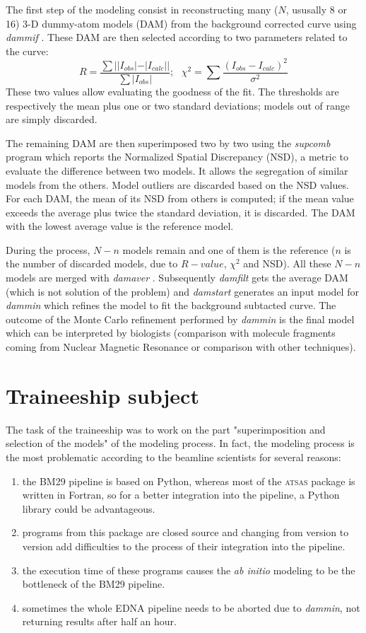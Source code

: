 \documentclass[a4paper, 11pt]{report}
\begin{document}
The first step of the modeling consist in reconstructing many ($N$, ususally 8
or 16) 3-D dummy-atom models (DAM) from the background corrected curve using 
\textit{dammif} \cite{dammif}. 
These DAM are then selected according to two parameters related to the 
curve: 
\[
R = \frac {\sum {||I_{obs}| - |I_{calc}||}}{\sum {|I_{obs}|}}; \ \ \ 
\chi^{2} = \sum {\frac {(I_{obs} - I_{calc})^{2}}{\sigma^{2}}}
\]
These two values allow evaluating the goodness of the fit. 
The thresholds are respectively the mean plus one or two standard 
deviations; models out of range are simply discarded.

The remaining DAM are then superimposed two by two using the 
\textit{supcomb} \cite{supcomb} program which reports the Normalized 
Spatial Discrepancy (NSD), a metric to evaluate the difference between 
two models. 
It allows the segregation of similar models from the others. 
Model outliers are discarded based on the NSD
values.
For each DAM, the mean of its NSD from others is computed; if the mean 
value exceeds the average plus twice the standard deviation, it is 
discarded. 
The DAM with the lowest average value is the reference model.

During the process, $N - n$ models remain and one of them is the 
reference ($n$ is the number of discarded models, due to $R-value$, 
$\chi^{2}$ and NSD). 
All these $N - n$ models are merged with \textit{damaver} 
\cite{damaver}. 
Subsequently \textit{damfilt} gets the average DAM (which is not solution of
the problem) and \textit{damstart} generates an input model for 
\textit{dammin} \cite{dammin} which refines the model to fit the 
background subtacted curve. 
The outcome of the Monte Carlo refinement performed by \textit{dammin} 
is the final model which can be interpreted by biologists (comparison 
with molecule fragments coming from Nuclear Magnetic Resonance or 
comparison with other techniques).

\section{Traineeship subject}

The task of the traineeship was to work on the part "superimposition 
and selection of the models" of the modeling process. 
In fact, the modeling process is the most problematic according to 
the beamline scientists for several reasons:
\begin{enumerate}
\item the BM29 pipeline is based on Python, whereas most
of the \textsc{atsas} package is written in Fortran, so for a better 
integration into the pipeline, a Python library could be advantageous. 
\item programs from this package are closed source and 
changing from version to version add difficulties to the process of 
their integration into the pipeline. 
\item the execution time of these programs causes the 
  \textit{ab initio} modeling to be the bottleneck of the BM29 
  pipeline. 
\item sometimes the whole EDNA pipeline needs to be aborted 
due to \textit{dammin}, not returning results after half an hour.
\end{enumerate}
\end{document}
